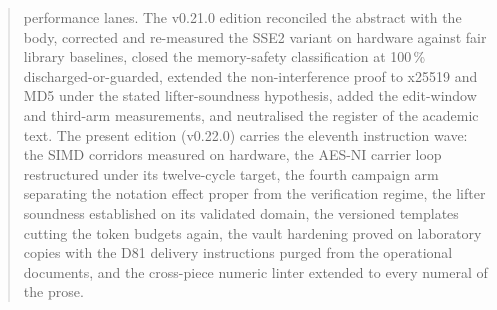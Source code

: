 \documentclass[11pt,a4paper]{article}
\begin{document}
\begin{abstract}
performance lanes. The v0.21.0 edition reconciled the abstract with
the body, corrected and re-measured the SSE2 variant on hardware
against fair library baselines, closed the memory-safety
classification at 100\,\% discharged-or-guarded, extended the
non-interference proof to x25519 and MD5 under the stated
lifter-soundness hypothesis, added the edit-window and third-arm
measurements, and neutralised the register of the academic text. The
present edition (v0.22.0) carries the eleventh instruction wave: the
SIMD corridors measured on hardware, the AES-NI carrier loop
restructured under its twelve-cycle target, the fourth campaign arm
separating the notation effect proper from the verification regime,
the lifter soundness established on its validated domain, the
versioned templates cutting the token budgets again, the vault
hardening proved on laboratory copies with the D81 delivery
instructions purged from the operational documents, and the cross-piece
numeric linter extended to every numeral of the prose.

\end{abstract}
\end{document}
